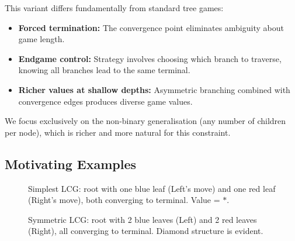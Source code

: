\documentclass[10pt,a4paper,twocolumn]{article}
\theoremstyle{plain}
\theoremstyle{definition}
\theoremstyle{remark}
\begin{document}
This variant differs fundamentally from standard tree games:
\begin{itemize}
\item \textbf{Forced termination:} The convergence point eliminates ambiguity about game length.
\item \textbf{Endgame control:} Strategy involves choosing which branch to traverse, knowing all branches lead to the same terminal.
\item \textbf{Richer values at shallow depths:} Asymmetric branching combined with convergence edges produces diverse game values.
\end{itemize}

We focus exclusively on the non-binary generalisation (any number of children per node), which is richer and more natural for this constraint.

\subsection{Motivating Examples}

\begin{figure}[h!]
\centering
{}
\vspace{10pt}
\caption{Simplest LCG: root with one blue leaf (Left's move) and one red leaf (Right's move), both converging to terminal. Value = $*$.}
\end{figure}

\begin{figure}[h!]
\centering
{}
\vspace{10pt}
\caption{Symmetric LCG: root with 2 blue leaves (Left) and 2 red leaves (Right), all converging to terminal. Diamond structure is evident.}
\end{figure}
\end{document}
